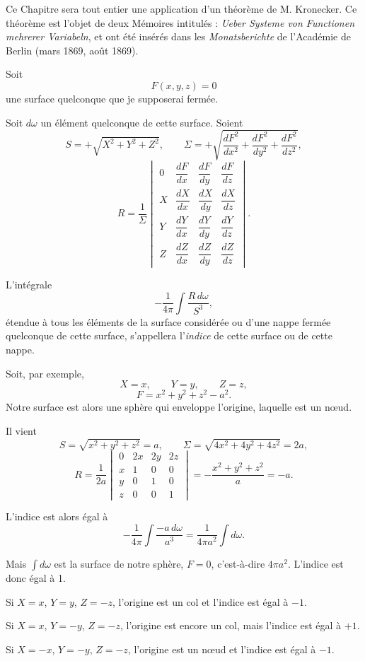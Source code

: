 \documentclass[11pt]{article}
\begin{document}
Ce Chapitre sera tout entier une application d’un théorème de M. Kronecker. Ce théorème est l’objet de deux Mémoires intitulés : \emph{Ueber Systeme von Functionen mehrerer Variabeln}, et ont été insérés dans les \emph{Monatsberichte} de l’Académie de Berlin (mars 1869, août 1869).

Soit
\[
F(x,y,z)=0
\]
une surface quelconque que je supposerai fermée.

Soit $d\omega$ un élément quelconque de cette surface. Soient
\[
S=+\sqrt{X^2+Y^2+Z^2},
\qquad
\Sigma=+\sqrt{\frac{dF^2}{dx^2}+\frac{dF^2}{dy^2}+\frac{dF^2}{dz^2}},
\]
\[
R=\frac1{\Sigma}
\begin{vmatrix}
0 & \dfrac{dF}{dx} & \dfrac{dF}{dy} & \dfrac{dF}{dz}\\
X & \dfrac{dX}{dx} & \dfrac{dX}{dy} & \dfrac{dX}{dz}\\
Y & \dfrac{dY}{dx} & \dfrac{dY}{dy} & \dfrac{dY}{dz}\\
Z & \dfrac{dZ}{dx} & \dfrac{dZ}{dy} & \dfrac{dZ}{dz}
\end{vmatrix}.
\]

L’intégrale
\[
-\frac1{4\pi}\int\frac{R\,d\omega}{S^3},
\]
étendue à tous les éléments de la surface considérée ou d’une nappe fermée quelconque de cette surface, s’appellera l’\emph{indice} de cette surface ou de cette nappe.

Soit, par exemple,
\[
X=x,\qquad Y=y,\qquad Z=z,
\]
\[
F=x^2+y^2+z^2-a^2.
\]
Notre surface est alors une sphère qui enveloppe l’origine, laquelle est un nœud.

Il vient
\[
S=\sqrt{x^2+y^2+z^2}=a,
\qquad
\Sigma=\sqrt{4x^2+4y^2+4z^2}=2a,
\]
\[
R=\frac1{2a}
\begin{vmatrix}
0&2x&2y&2z\\
x&1&0&0\\
y&0&1&0\\
z&0&0&1
\end{vmatrix}
=-\frac{x^2+y^2+z^2}{a}=-a.
\]

L’indice est alors égal à
\[
-\frac1{4\pi}\int\frac{-a\,d\omega}{a^3}
=\frac1{4\pi a^2}\int d\omega.
\]

Mais $\int d\omega$ est la surface de notre sphère, $F=0$, c’est-à-dire $4\pi a^2$. L’indice est donc égal à 1.

Si $X=x$, $Y=y$, $Z=-z$, l’origine est un col et l’indice est égal à $-1$.

Si $X=x$, $Y=-y$, $Z=-z$, l’origine est encore un col, mais l’indice est égal à $+1$.

Si $X=-x$, $Y=-y$, $Z=-z$, l’origine est un nœud et l’indice est égal à $-1$.
\end{document}
